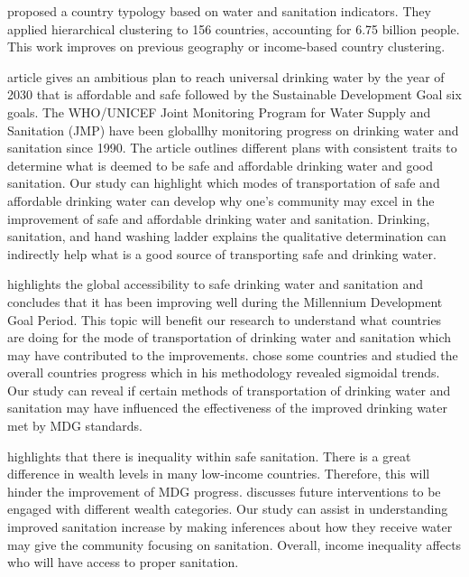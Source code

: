 \documentclass[10pt,twoside]{article}
\numberwithin{equation}{section}
\newcommand{\?}{\stackrel{?}{=}}
\begin{document}
\citet{onda2014country} proposed a country typology based on water and sanitation indicators. They applied hierarchical clustering to 156 countries, accounting for 6.75 billion people. This work improves on previous geography or income-based country clustering. 

\citet{WHOdrinkingwater} article gives an ambitious plan to reach universal drinking water by the year of 2030 that is
affordable and safe followed by the Sustainable Development Goal six goals. The WHO/UNICEF Joint Monitoring Program for
Water Supply and Sanitation (JMP) have been globallhy monitoring progress on drinking water and sanitation since 1990. The
article outlines different plans with consistent traits to determine what is deemed to be safe and affordable drinking
water and good sanitation. Our study can highlight which modes of transportation of safe and affordable drinking water
can develop why one's community may excel in the improvement of safe and affordable drinking water and
sanitation. Drinking, sanitation, and hand washing ladder explains the qualitative determination can indirectly help
what is a good source of transporting safe and drinking water.

\citet{fuller2016tracking} highlights the global accessibility to safe drinking water and sanitation and concludes that
it has been improving well during the Millennium Development Goal Period. This topic will benefit our research to
understand what countries are doing for the mode of transportation of drinking water and sanitation which may have
contributed to the improvements. \citet{fuller2016tracking} chose some countries and studied the overall countries
progress which in his methodology revealed sigmoidal trends. Our study can reveal if certain methods of transportation
of drinking water and sanitation may have influenced the effectiveness of the improved drinking water met by MDG
standards.

\citet{jia2016highresolution} highlights that there is inequality within safe sanitation. There is a great difference in
wealth levels in many low-income countries. Therefore, this will hinder the improvement of MDG
progress. \citet{jia2016highresolution}discusses future interventions to be engaged with different wealth
categories. Our study can assist in understanding improved sanitation increase by making inferences about how they
receive water may give the community focusing on sanitation. Overall, income inequality affects who will have access to
proper sanitation.
\end{document}
